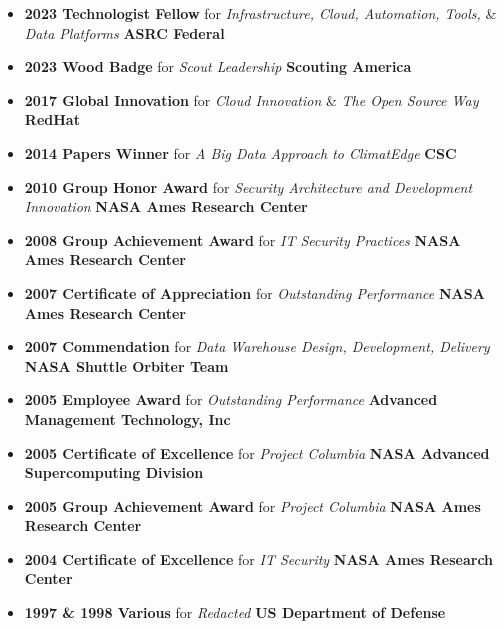 \begin{itemize}
	\parskip=0.1em
	\item
	\headerrow
		{\textbf{2023 Technologist Fellow} for {\emph{Infrastructure, Cloud, Automation, Tools,}} \& {\emph{Data Platforms}}}
		{\textbf{ASRC Federal}}
  	\item
  	\headerrow
  		{\textbf{2023 Wood Badge} for {\emph{Scout Leadership}}}
  		{\textbf{Scouting America}}
    \item
	\headerrow
		{\textbf{2017 Global Innovation} for {\emph{Cloud Innovation}} \& {\emph{The Open Source Way}}}
		{\textbf{RedHat}}
  \item
	\headerrow
		{\textbf{2014 Papers Winner} for {\emph{A Big Data Approach to ClimatEdge\texttrademark}}}
		{\textbf{CSC}}

	\item
	\headerrow
		{\textbf{2010 Group Honor Award} for {\emph{Security Architecture and Development Innovation}}}
		{\textbf{NASA Ames Research Center}}

	\item
	\headerrow
		{\textbf{2008 Group Achievement Award} for {\emph{IT Security Practices}} }
		{\textbf{NASA Ames Research Center}}

	\item
	\headerrow
		{\textbf{2007 Certificate of Appreciation} for {\emph{Outstanding Performance}}}
		{\textbf{NASA Ames Research Center}}

	\item
	\headerrow
		{\textbf{2007 Commendation} for {\emph{Data Warehouse Design, Development, Delivery}} }
		{\textbf{NASA Shuttle Orbiter Team}}

	\item
	\headerrow
		{\textbf{2005 Employee Award} for {\emph{Outstanding Performance}} }
		{\textbf{Advanced Management Technology, Inc}}

	\item
	\headerrow
		{\textbf{2005 Certificate of Excellence} for {\emph{Project Columbia}}}
		{\textbf{NASA Advanced Supercomputing Division}}

	\item
	\headerrow
		{\textbf{2005 Group Achievement Award} for {\emph{Project Columbia}}}
		{\textbf{NASA Ames Research Center}}

	\item
	\headerrow
		{\textbf{2004 Certificate of Excellence} for {\emph{IT Security}}}
		{\textbf{NASA Ames Research Center}}

	\item
	\headerrow
		{\textbf{1997 \& 1998 Various} for {\emph{Redacted}}}
		{\textbf{US Department of Defense}}

\end{itemize}

